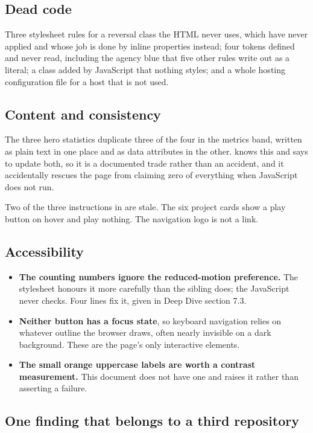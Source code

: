 \documentclass[11pt,a4paper]{article}
\begin{document}
\subsection{Dead code}

Three stylesheet rules for a reversal class the HTML never uses, which have never
applied and whose job is done by inline  properties instead; four tokens
defined and never read, including the agency blue that five other rules write out as
a literal; a class added by JavaScript that nothing styles; and a whole hosting
configuration file for a host that is not used.

\subsection{Content and consistency}

The three hero statistics duplicate three of the four in the metrics band, written
as plain text in one place and as data attributes in the other. 
knows this and says to update both, so it is a documented trade rather than an
accident, and it accidentally rescues the page from claiming zero of everything when
JavaScript does not run.

Two of the three instructions in  are stale. The six project cards
show a play button on hover and play nothing. The navigation logo is not a link.

\subsection{Accessibility}

\begin{itemize}
\item \textbf{The counting numbers ignore the reduced-motion preference.} The
  stylesheet honours it more carefully than the sibling does; the JavaScript never
  checks. Four lines fix it, given in Deep Dive section 7.3.
\item \textbf{Neither button has a focus state}, so keyboard navigation relies on
  whatever outline the browser draws, often nearly invisible on a dark background.
  These are the page's only interactive elements.
\item \textbf{The small orange uppercase labels are worth a contrast measurement.}
  This document does not have one and raises it rather than asserting a failure.
\end{itemize}

\subsection{One finding that belongs to a third repository}
\end{document}
